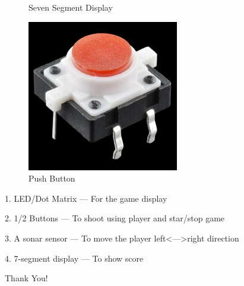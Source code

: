 \documentclass[15pt]{beamer}
\begin{document}
\begin{frame}
\begin{figure}
\begin{minipage}[b]{0.4\textwidth}
    \caption{Seven Segment Display}
  \end{minipage}
    \hfill
  \begin{minipage}[b]{0.4\textwidth}
    \includegraphics[width=.5\textwidth]{push_button.jpg}
    \caption{Push Button}
  \end{minipage}
\end{figure}

\end{frame}

\begin{frame}

1. LED/Dot Matrix --- For the game display

2. 1/2 Buttons --- To shoot using player and star/stop game

3. A sonar sensor --- To move the player left<--->right direction

4. 7-segment display --- To show score

\end{frame}


\begin{frame}%
\begin{center}
\Huge Thank You!
\end{center}
\end{frame}
\end{document}
